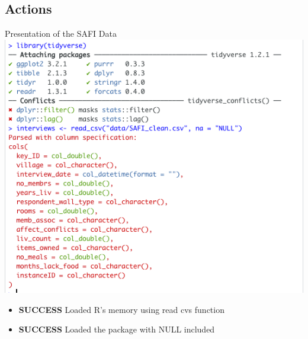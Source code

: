 \documentclass{article}
\begin{document}
\subsection{Actions}
Presentation of the SAFI Data \\
\includegraphics[width=\textwidth]{Images/RStudio_9.png}
\begin{itemize}
\item \textbf{SUCCESS} Loaded R's memory using read cvs function
\item \textbf{SUCCESS} Loaded the package with NULL included
\end{itemize}
\end{document}
